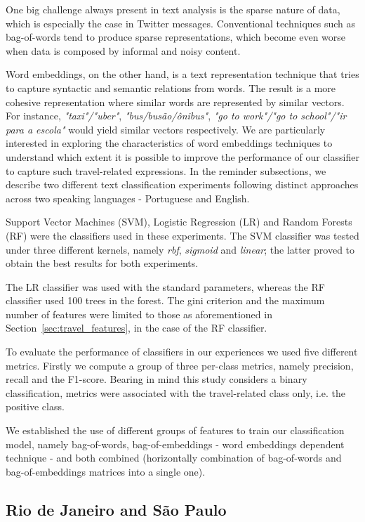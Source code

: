 One big challenge always present in text analysis is the sparse nature of data, which is especially the case in Twitter messages. Conventional techniques such as bag-of-words tend to produce sparse representations, which become even worse when data is composed by informal and noisy content.

Word embeddings, on the other hand, is a text representation technique that tries to capture syntactic and semantic relations from words. The result is a more cohesive representation where similar words are represented by similar vectors. For instance, \emph{"taxi"/"uber"}, \emph{"bus/busão/ônibus"}, \emph{"go to work"/"go to school"/"ir para a escola"} would yield similar vectors respectively.
We are particularly interested in exploring the characteristics of word embeddings techniques to understand which extent it is possible to improve the performance of our classifier to capture such travel-related expressions. In the reminder subsections, we describe two different text classification experiments following distinct approaches across two speaking languages - Portuguese and English.

Support Vector Machines (SVM), Logistic Regression (LR) and Random Forests (RF) were the classifiers used in these experiments. The SVM classifier was tested under three different kernels, namely \textit{rbf}, \textit{sigmoid} and \textit{linear}; the latter proved to obtain the best results for both experiments. 

The LR classifier was used with the standard parameters, whereas the RF classifier used 100 trees in the forest. The gini criterion and the maximum number of features were limited to those as aforementioned in Section~\ref{sec:travel_features}, in the case of the RF classifier.

To evaluate the performance of classifiers in our experiences we used five different metrics. Firstly we compute a group of three per-class metrics, namely precision, recall and the F1-score. Bearing in mind this study considers a binary classification, metrics were associated with the travel-related class only, i.e. the positive class.

We established the use of different groups of features to train our classification model, namely bag-of-words, bag-of-embeddings - word embeddings dependent technique - and both combined (horizontally combination of bag-of-words and bag-of-embeddings matrices into a single one).

\subsection{Rio de Janeiro and São Paulo}
\label{subsec:rio_de_janeiro_sao_paulo_experiment}

